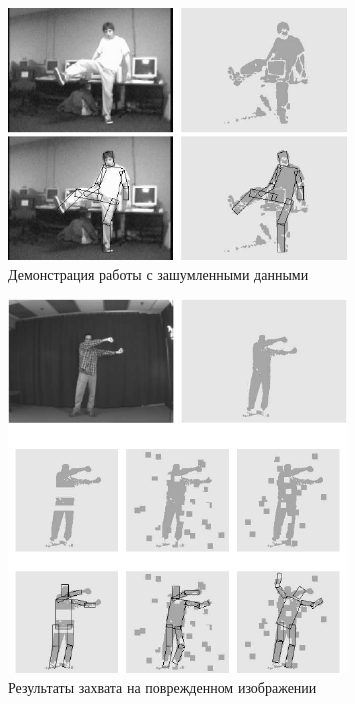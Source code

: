 \begin{figure}
  \centering
  \includegraphics[width=0.8\textwidth]{images/detection-noisy.png}
  \caption{Демонстрация работы с зашумленными данными\label{detection-noisy}}
\end{figure}

\begin{figure}
  \centering
  \includegraphics[width=0.8\textwidth]{images/detection-corrupted.png}
  \caption{Результаты захвата на поврежденном изображении\label{detection-corrupted}}
\end{figure}

\newpage
